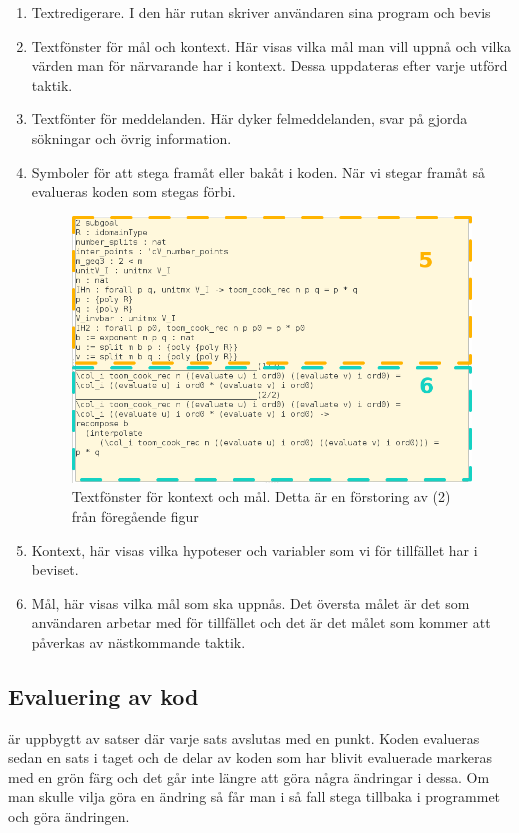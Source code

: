 \begin{enumerate}
\item Textredigerare. I den här rutan skriver användaren sina program och bevis
\item Textfönster för mål och kontext. Här visas vilka mål man vill uppnå och
  vilka värden man för närvarande har i kontext. Dessa uppdateras efter varje
  utförd taktik.
\item Textfönter för meddelanden. Här dyker felmeddelanden, svar på
  gjorda sökningar och övrig information.
\item Symboler för att stega framåt eller bakåt i koden. När vi stegar framåt
  så evalueras koden som stegas förbi.


\begin{figure}[H]
  \centering
  \includegraphics[width=150mm]{images/Kontext}
  \caption[Fönster för kontext och mål]
   {Textfönster för kontext och mål. Detta är en förstoring av (2) från
     föregående figur}
\end{figure}

\item Kontext, här visas vilka hypoteser och variabler som vi för tillfället
  har i beviset.
\item Mål, här visas vilka mål som ska uppnås. Det översta målet är det som
  användaren arbetar med för tillfället och det är det målet som kommer att
  påverkas av nästkommande taktik.
\end{enumerate}

\subsection{Evaluering av kod}
\coq är uppbygtt av satser där varje sats avslutas med en punkt. Koden
evalueras sedan en sats i taget och de delar av koden som har blivit evaluerade
markeras med en grön färg och det går inte längre att göra några ändringar i
dessa. Om man skulle vilja göra en ändring så får man i så fall stega tillbaka
i programmet och göra ändringen.

